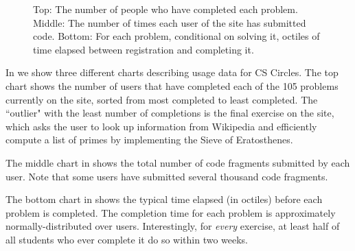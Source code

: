 \documentclass{article}
\begin{document}
{\begin{figure}
\vspace{4mm}

\caption{Top: The number of people who have completed each problem. Middle: The number of times each user of the site has submitted code. Bottom: For each problem, conditional on solving it, octiles of time elapsed between registration and completing it.}
\label{fig:data}
\end{figure}

In  we show three different charts describing usage data for CS Circles. The top chart shows the number of users that have completed each of the 105 problems currently on the site, sorted from most completed to least completed. The ``outlier" with the least number of completions is the final exercise on the site, which asks the user to look up information from Wikipedia and efficiently compute a list of primes by implementing the Sieve of Eratosthenes.

The middle chart in  shows the total number of code fragments submitted by each user. Note that some users have submitted several thousand code fragments.

The bottom chart in  shows the typical time elapsed (in octiles) before each problem is completed. The completion time for each problem is approximately normally-distributed over users. Interestingly, for \emph{every} exercise, at least half of all students who ever complete it do so within two weeks.

}
\end{document}
